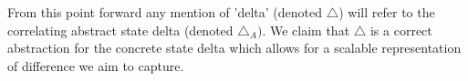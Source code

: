 %

From this point forward any mention of 'delta' (denoted $\triangle$) will refer to the correlating abstract state delta (denoted $\triangle_{A})$. We claim that $\triangle$ is a correct abstraction for the concrete state delta which allows for a scalable representation of difference we aim to capture.
